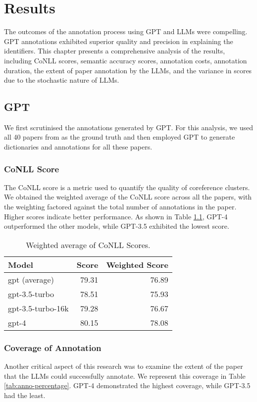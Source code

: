 \chapter{Results}\label{chapter:results}

The outcomes of the annotation process using GPT and LLMs were compelling. GPT annotations exhibited superior quality and precision in explaining the identifiers. This chapter presents a comprehensive analysis of the results, including CoNLL scores, semantic accuracy scores, annotation costs, annotation duration, the extent of paper annotation by the LLMs, and the variance in scores due to the stochastic nature of LLMs.

\section{GPT}
We first scrutinised the annotations generated by GPT. For this analysis, we used all 40 papers from \cite{asakura2022building} as the ground truth and then employed GPT to generate dictionaries and annotations for all these papers.

\subsection{CoNLL Score}
The CoNLL score is a metric used to quantify the quality of coreference clusters. We obtained the weighted average of the CoNLL score across all the papers, with the weighting factored against the total number of annotations in the paper. Higher scores indicate better performance. As shown in Table \ref{tab:conll-score}, GPT-4 outperformed the other models, while GPT-3.5 exhibited the lowest score.

\begin{table}[htpb]
  \centering
  \begin{tabular}{lrr}
    \hline
    Model & Score & Weighted Score \\
    \hline
    gpt (average) & 79.31 & 76.89 \\
    gpt-3.5-turbo & 78.51 & 75.93 \\
    gpt-3.5-turbo-16k & 79.28 & 76.67 \\
    gpt-4 & 80.15 & 78.08\\
    \hline
  \end{tabular}
  \caption[CoNLL Scores]{Weighted average of CoNLL Scores.}
  \label{tab:conll-score}
\end{table}

\subsection{Coverage of Annotation}
Another critical aspect of this research was to examine the extent of the paper that the LLMs could successfully annotate. We represent this coverage in Table \ref{tab:anno-percentage}. GPT-4 demonstrated the highest coverage, while GPT-3.5 had the least.

